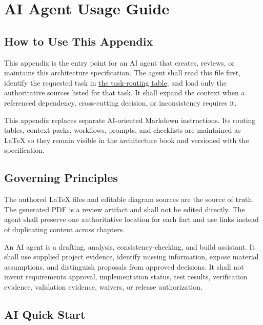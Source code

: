 \chapter{AI Agent Usage Guide}

\section{How to Use This Appendix}
This appendix is the entry point for an AI agent that creates, reviews, or
maintains this architecture specification. The agent shall read this file
first, identify the requested task in
\hyperref[Table:AITaskRouting]{the task-routing table}, and load only the
authoritative sources listed for that task. It shall expand the context when a
referenced dependency, cross-cutting decision, or inconsistency requires it.

This appendix replaces separate AI-oriented Markdown instructions. Its routing
tables, context packs, workflows, prompts, and checklists are maintained as
LaTeX so they remain visible in the architecture book and versioned with the
specification.

\section{Governing Principles}
The authored LaTeX files and editable diagram sources are the source of truth.
The generated PDF is a review artifact and shall not be edited directly. The
agent shall preserve one authoritative location for each fact and use links
instead of duplicating content across chapters.

An AI agent is a drafting, analysis, consistency-checking, and build assistant.
It shall use supplied project evidence, identify missing information, expose
material assumptions, and distinguish proposals from approved decisions. It
shall not invent requirements approval, implementation status, test results,
verification evidence, validation evidence, waivers, or release authorization.

\section{AI Quick Start}
\label{Section:AIQuickStart}

